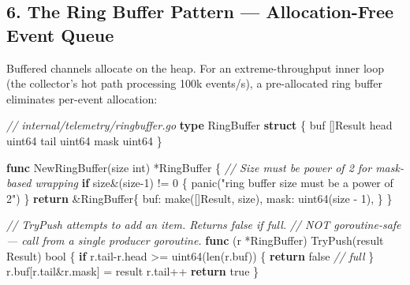 \documentclass[
]{article}
\newenvironment{Shaded}{}{}
\newcommand{\BuiltInTok}[1]{\textcolor[rgb]{0.00,0.50,0.00}{#1}}
\newcommand{\CommentTok}[1]{\textcolor[rgb]{0.38,0.63,0.69}{\textit{#1}}}
\newcommand{\ControlFlowTok}[1]{\textcolor[rgb]{0.00,0.44,0.13}{\textbf{#1}}}
\newcommand{\DataTypeTok}[1]{\textcolor[rgb]{0.56,0.13,0.00}{#1}}
\newcommand{\DecValTok}[1]{\textcolor[rgb]{0.25,0.63,0.44}{#1}}
\newcommand{\KeywordTok}[1]{\textcolor[rgb]{0.00,0.44,0.13}{\textbf{#1}}}
\newcommand{\NormalTok}[1]{#1}
\newcommand{\OperatorTok}[1]{\textcolor[rgb]{0.40,0.40,0.40}{#1}}
\newcommand{\OtherTok}[1]{\textcolor[rgb]{0.00,0.44,0.13}{#1}}
\newcommand{\StringTok}[1]{\textcolor[rgb]{0.25,0.44,0.63}{#1}}
\begin{document}
\hypertarget{the-ring-buffer-pattern-allocation-free-event-queue}{%
\subsection{6. The Ring Buffer Pattern --- Allocation-Free Event
Queue}\label{the-ring-buffer-pattern-allocation-free-event-queue}}

Buffered channels allocate on the heap. For an extreme-throughput inner
loop (the collector's hot path processing 100k events/s), a
pre-allocated ring buffer eliminates per-event allocation:

\begin{Shaded}
\begin{Highlighting}[]
\CommentTok{// internal/telemetry/ringbuffer.go}
\KeywordTok{type}\NormalTok{ RingBuffer }\KeywordTok{struct} \OperatorTok{\{}
\NormalTok{    buf  }\OperatorTok{[]}\NormalTok{Result}
\NormalTok{    head }\DataTypeTok{uint64}
\NormalTok{    tail }\DataTypeTok{uint64}
\NormalTok{    mask }\DataTypeTok{uint64}
\OperatorTok{\}}

\KeywordTok{func}\NormalTok{ NewRingBuffer}\OperatorTok{(}\NormalTok{size }\DataTypeTok{int}\OperatorTok{)} \OperatorTok{*}\NormalTok{RingBuffer }\OperatorTok{\{}
    \CommentTok{// Size must be power of 2 for mask{-}based wrapping}
    \ControlFlowTok{if}\NormalTok{ size}\OperatorTok{\&(}\NormalTok{size}\DecValTok{{-}1}\OperatorTok{)} \OperatorTok{!=} \DecValTok{0} \OperatorTok{\{}
        \BuiltInTok{panic}\OperatorTok{(}\StringTok{"ring buffer size must be a power of 2"}\OperatorTok{)}
    \OperatorTok{\}}
    \ControlFlowTok{return} \OperatorTok{\&}\NormalTok{RingBuffer}\OperatorTok{\{}
\NormalTok{        buf}\OperatorTok{:}  \BuiltInTok{make}\OperatorTok{([]}\NormalTok{Result}\OperatorTok{,}\NormalTok{ size}\OperatorTok{),}
\NormalTok{        mask}\OperatorTok{:} \DataTypeTok{uint64}\OperatorTok{(}\NormalTok{size }\OperatorTok{{-}} \DecValTok{1}\OperatorTok{),}
    \OperatorTok{\}}
\OperatorTok{\}}

\CommentTok{// TryPush attempts to add an item. Returns false if full.}
\CommentTok{// NOT goroutine{-}safe — call from a single producer goroutine.}
\KeywordTok{func} \OperatorTok{(}\NormalTok{r }\OperatorTok{*}\NormalTok{RingBuffer}\OperatorTok{)}\NormalTok{ TryPush}\OperatorTok{(}\NormalTok{result Result}\OperatorTok{)} \DataTypeTok{bool} \OperatorTok{\{}
    \ControlFlowTok{if}\NormalTok{ r}\OperatorTok{.}\NormalTok{tail}\OperatorTok{{-}}\NormalTok{r}\OperatorTok{.}\NormalTok{head }\OperatorTok{\textgreater{}=} \DataTypeTok{uint64}\OperatorTok{(}\BuiltInTok{len}\OperatorTok{(}\NormalTok{r}\OperatorTok{.}\NormalTok{buf}\OperatorTok{))} \OperatorTok{\{}
        \ControlFlowTok{return} \OtherTok{false} \CommentTok{// full}
    \OperatorTok{\}}
\NormalTok{    r}\OperatorTok{.}\NormalTok{buf}\OperatorTok{[}\NormalTok{r}\OperatorTok{.}\NormalTok{tail}\OperatorTok{\&}\NormalTok{r}\OperatorTok{.}\NormalTok{mask}\OperatorTok{]} \OperatorTok{=}\NormalTok{ result}
\NormalTok{    r}\OperatorTok{.}\NormalTok{tail}\OperatorTok{++}
    \ControlFlowTok{return} \OtherTok{true}
\OperatorTok{\}}


\end{Highlighting}
\end{Shaded}
\end{document}
